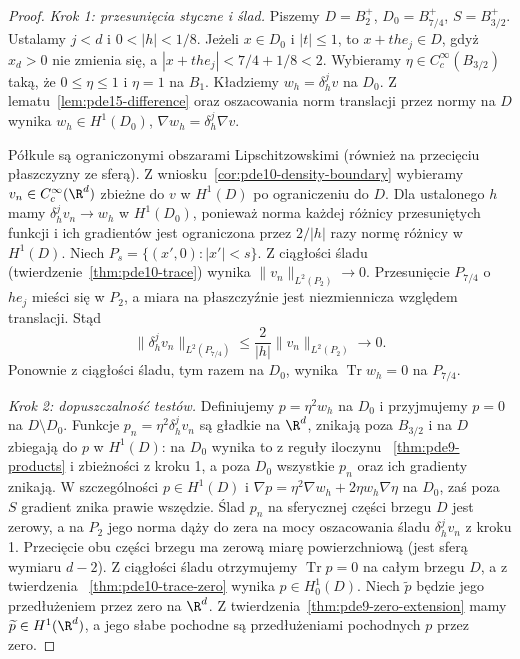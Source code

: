 \begin{proof}
\emph{Krok 1: przesunięcia styczne i ślad.}
Piszemy $D=B_2^+$, $D_0=B_{7/4}^+$, $S=B_{3/2}^+$.
Ustalamy $j<d$ i $0<|h|<1/8$. Jeżeli $x\in D_0$
i $|t|\le1$, to $x+the_j\in D$, gdyż
$x_d>0$ nie zmienia się, a $|x+the_j|<7/4+1/8<2$.
Wybieramy $\eta\in C_c^\infty(B_{3/2})$ taką, że
$0\le\eta\le1$ i $\eta=1$ na $B_1$.
Kładziemy $w_h=\delta_h^jv$ na $D_0$.
Z lematu~\ref{lem:pde15-difference} oraz oszacowania
norm translacji przez normy na $D$ wynika
$w_h\in H^1(D_0)$, $\nabla w_h=\delta_h^j\nabla v$.

Półkule są ograniczonymi obszarami Lipschitzowskimi
(również na przecięciu płaszczyzny ze sferą).
Z wniosku~\ref{cor:pde10-density-boundary} wybieramy
$v_n\in C_c^\infty(\R^d)$ zbieżne do $v$ w $H^1(D)$
po ograniczeniu do $D$. Dla ustalonego $h$ mamy
$\delta_h^jv_n\to w_h$ w $H^1(D_0)$, ponieważ norma
każdej różnicy przesuniętych funkcji i ich gradientów
jest ograniczona przez $2/|h|$ razy normę różnicy w $H^1(D)$.
Niech $P_s=\{(x',0):|x'|<s\}$.
Z ciągłości śladu (twierdzenie~\ref{thm:pde10-trace})
wynika $\|v_n\|_{L^2(P_2)}\to0$. Przesunięcie $P_{7/4}$
o $he_j$ mieści się w $P_2$, a miara na płaszczyźnie
jest niezmiennicza względem translacji. Stąd
\[
 \|\delta_h^jv_n\|_{L^2(P_{7/4})}
 \le \frac{2}{|h|}\|v_n\|_{L^2(P_2)}\longrightarrow0.
\]
Ponownie z ciągłości śladu, tym razem na $D_0$, wynika
$\operatorname{Tr}w_h=0$ na $P_{7/4}$.

\emph{Krok 2: dopuszczalność testów.}
Definiujemy $p=\eta^2w_h$ na $D_0$ i przyjmujemy $p=0$
na $D\setminus D_0$. Funkcje
$p_n=\eta^2\delta_h^jv_n$ są gładkie na $\R^d$,
znikają poza $B_{3/2}$ i na $D$ zbiegają do $p$
w $H^1(D)$: na $D_0$ wynika to z reguły iloczynu
~\ref{thm:pde9-products} i zbieżności z kroku 1,
a poza $D_0$ wszystkie $p_n$ oraz ich gradienty znikają.
W szczególności $p\in H^1(D)$ i
$\nabla p=\eta^2\nabla w_h+2\eta w_h\nabla\eta$
na $D_0$, zaś poza $S$ gradient znika prawie wszędzie.
Ślad $p_n$ na sferycznej części brzegu $D$ jest zerowy,
a na $P_2$ jego norma dąży do zera na mocy oszacowania
śladu $\delta_h^jv_n$ z kroku 1. Przecięcie obu części
brzegu ma zerową miarę powierzchniową (jest sferą
wymiaru $d-2$). Z ciągłości śladu otrzymujemy
$\operatorname{Tr}p=0$ na całym brzegu $D$, a z twierdzenia
~\ref{thm:pde10-trace-zero} wynika $p\in H_0^1(D)$.
Niech $\widetilde p$ będzie jego przedłużeniem przez zero
na $\R^d$. Z twierdzenia~\ref{thm:pde9-zero-extension}
mamy $\widetilde p\in H^1(\R^d)$, a jego słabe
pochodne są przedłużeniami pochodnych $p$ przez zero.


\end{proof}
